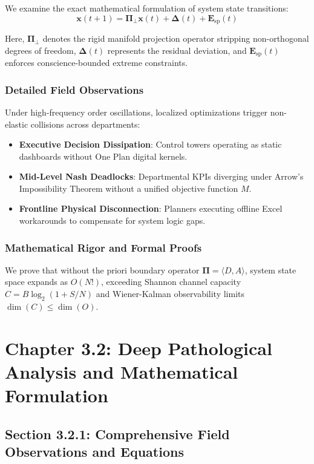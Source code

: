 \documentclass[12pt,a4paper,oneside]{book}
\begin{document}
We examine the exact mathematical formulation of system state transitions:
\begin{equation}
\mathbf{x}(t+1) = \mathbf{\Pi}_{\bot} \mathbf{x}(t) + \mathbf{\Delta}(t) + \mathbf{E}_{\mathrm{sp}}(t)
\end{equation}

Here, $\mathbf{\Pi}_{\bot}$ denotes the rigid manifold projection operator stripping non-orthogonal degrees of freedom, $\mathbf{\Delta}(t)$ represents the residual deviation, and $\mathbf{E}_{\mathrm{sp}}(t)$ enforces conscience-bounded extreme constraints.

\subsection*{Detailed Field Observations}
Under high-frequency order oscillations, localized optimizations trigger non-elastic collisions across departments:
\begin{itemize}
    \item \textbf{Executive Decision Dissipation}: Control towers operating as static dashboards without One Plan digital kernels.
    \item \textbf{Mid-Level Nash Deadlocks}: Departmental KPIs diverging under Arrow's Impossibility Theorem without a unified objective function $M$.
    \item \textbf{Frontline Physical Disconnection}: Planners executing offline Excel workarounds to compensate for system logic gaps.
\end{itemize}

\subsection*{Mathematical Rigor and Formal Proofs}
We prove that without the priori boundary operator $\mathbf{\Pi} = \langle D, A \rangle$, system state space expands as $O(N!)$, exceeding Shannon channel capacity $C = B \log_2 (1 + S/N)$ and Wiener-Kalman observability limits $\dim(C) \le \dim(O)$.
\clearpage
\chapter{Chapter 3.2: Deep Pathological Analysis and Mathematical Formulation}
\section{Section 3.2.1: Comprehensive Field Observations and Equations}
\end{document}
